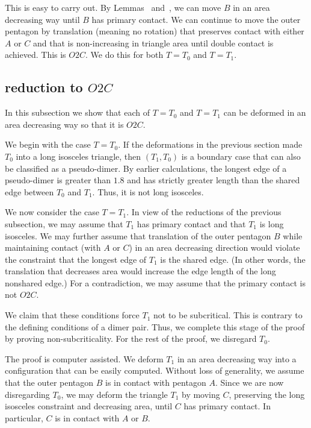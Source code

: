 This is easy to carry out.  By Lemmas~
and~, we can move $B$ in an area decreasing way
until $B$ has primary contact.  We can continue to move the outer
pentagon by translation (meaning no rotation) that preserves contact
with either $A$ or $C$ and that is non-increasing in triangle area
until double contact is achieved.  This is $O2C$.  We do this for both
$T=T_0$ and $T=T_1$.

\subsection{reduction to $O2C$}

In this subsection we show that each of $T=T_0$ and $T=T_1$ can be
deformed in an area decreasing way so that it is $O2C$.

We begin with the case $T=T_0$.  If the deformations in the previous
section made $T_0$ into a long isosceles triangle, then $(T_1,T_0)$ is
a boundary case that can also be classified as a pseudo-dimer.  By
earlier calculations, the longest edge of a pseudo-dimer is greater
than $1.8$ and has strictly greater length than the shared edge
between $T_0$ and $T_1$.  Thus, it is not long isosceles.

We now consider the case $T=T_1$.  In view of the reductions of the
previous subsection, we may assume that $T_1$ has primary contact and
that $T_1$ is long isosceles.  We may further assume that translation
of the outer pentagon $B$ while maintaining contact (with  $A$ or $C$)
in an area decreasing direction would violate the constraint that the
longest edge of $T_1$ is the shared edge.  (In other words, the
translation that decreases area would increase the edge length of the
long nonshared edge.)  For a contradiction, we may assume that the
primary contact is not $O2C$.

We claim that these conditions force $T_1$ not to be subcritical.
This is contrary to the defining conditions of a dimer pair.  Thus, we
complete this stage of the proof by proving non-subcriticality. For
the rest of the proof, we disregard $T_0$.

The proof is computer assisted.  We deform $T_1$ in an area decreasing
way into a configuration that can be easily computed.  Without loss of
generality, we assume that the outer pentagon $B$ is in contact with
pentagon $A$.  Since we are now disregarding $T_0$, we may deform the
triangle $T_1$ by moving $C$, preserving the long isosceles constraint
and decreasing area, until $C$ has primary contact.  In particular,
$C$ is in contact with $A$ or $B$.

